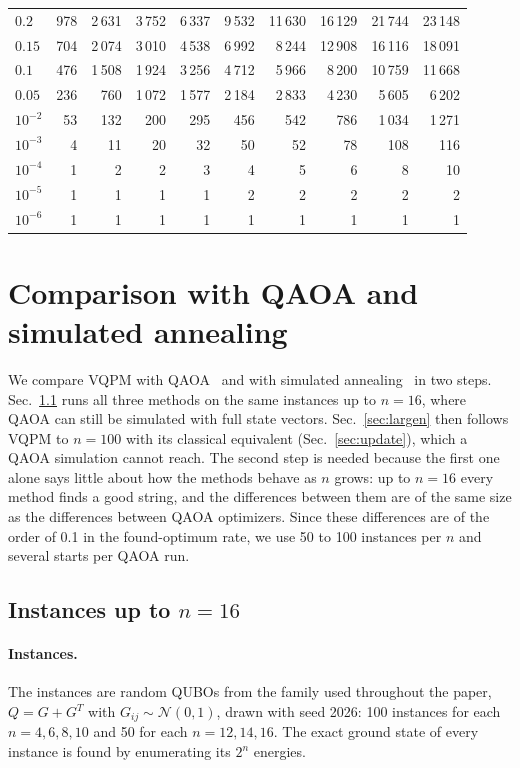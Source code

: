 \documentclass[onecolumn,10pt]{article}
\theoremstyle{remark}
\theoremstyle{plain}
\begin{document}
\begin{table}[ht]
\begin{tabular}{lrrrrrrrrr}
$0.2$ & 978 & 2\,631 & 3\,752 & 6\,337 & 9\,532 & 11\,630 & 16\,129 & 21\,744 & 23\,148 \\
$0.15$ & 704 & 2\,074 & 3\,010 & 4\,538 & 6\,992 & 8\,244 & 12\,908 & 16\,116 & 18\,091 \\
$0.1$ & 476 & 1\,508 & 1\,924 & 3\,256 & 4\,712 & 5\,966 & 8\,200 & 10\,759 & 11\,668 \\
$0.05$ & 236 & 760 & 1\,072 & 1\,577 & 2\,184 & 2\,833 & 4\,230 & 5\,605 & 6\,202 \\
$10^{-2}$ & 53 & 132 & 200 & 295 & 456 & 542 & 786 & 1\,034 & 1\,271 \\
$10^{-3}$ & 4 & 11 & 20 & 32 & 50 & 52 & 78 & 108 & 116 \\
$10^{-4}$ & 1 & 2 & 2 & 3 & 4 & 5 & 6 & 8 & 10 \\
$10^{-5}$ & 1 & 1 & 1 & 1 & 2 & 2 & 2 & 2 & 2 \\
$10^{-6}$ & 1 & 1 & 1 & 1 & 1 & 1 & 1 & 1 & 1 \\
\bottomrule
\end{tabular}
\end{table}

\section{Comparison with QAOA and simulated annealing}
\label{sec:comparison}
We compare VQPM with QAOA~\cite{farhi2014quantum} and with simulated annealing~\cite{kirkpatrick1983optimization} in two steps. Sec.~\ref{sec:smalln} runs all three methods on the same instances up to $n=16$, where QAOA can still be simulated with full state vectors. Sec.~\ref{sec:largen} then follows VQPM to $n=100$ with its classical equivalent (Sec.~\ref{sec:update}), which a QAOA simulation cannot reach. The second step is needed because the first one alone says little about how the methods behave as $n$ grows: up to $n=16$ every method finds a good string, and the differences between them are of the same size as the differences between QAOA optimizers. Since these differences are of the order of 0.1 in the found-optimum rate, we use 50 to 100 instances per $n$ and several starts per QAOA run.

\subsection{Instances up to \texorpdfstring{$n=16$}{n=16}}
\label{sec:smalln}
\paragraph{Instances.} The instances are random QUBOs from the family used throughout the paper, $Q=G+G^T$ with $G_{ij}\sim\mathcal N(0,1)$, drawn with seed 2026: 100 instances for each $n=4,6,8,10$ and 50 for each $n=12,14,16$. The exact ground state of every instance is found by enumerating its $2^n$ energies.
\end{document}
